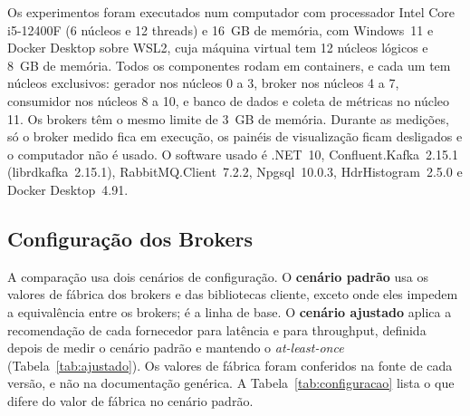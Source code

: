 \documentclass[12pt]{article}
\begin{document}
Os experimentos foram executados num computador com processador Intel Core i5-12400F
(6 núcleos e 12 threads) e 16~GB de memória, com Windows~11 e Docker Desktop sobre WSL2,
cuja máquina virtual tem 12 núcleos lógicos e 8~GB de memória. Todos os componentes rodam
em containers, e cada um tem núcleos exclusivos: gerador nos núcleos 0 a 3, broker nos
núcleos 4 a 7, consumidor nos núcleos 8 a 10, e banco de dados e coleta de métricas no
núcleo 11. Os brokers têm o mesmo limite de 3~GB de memória. Durante as medições, só o
broker medido fica em execução, os painéis de visualização ficam desligados e o computador
não é usado. O software usado é .NET~10, Confluent.Kafka~2.15.1 (librdkafka~2.15.1),
RabbitMQ.Client~7.2.2, Npgsql~10.0.3, HdrHistogram~2.5.0 e Docker Desktop~4.91.

\subsection{Configuração dos Brokers}
\label{sec:configuracao}

A comparação usa dois cenários de configuração. O \textbf{cenário padrão} usa os valores
de fábrica dos brokers e das bibliotecas cliente, exceto onde eles impedem a equivalência
entre os brokers; é a linha de base. O \textbf{cenário ajustado} aplica a recomendação de
cada fornecedor para latência e para throughput, definida depois de medir o cenário
padrão e mantendo o \textit{at-least-once} (Tabela~\ref{tab:ajustado}). Os valores de
fábrica foram conferidos na fonte de cada versão, e não na documentação genérica. A
Tabela~\ref{tab:configuracao} lista o que difere do valor de fábrica no cenário padrão.
\end{document}
